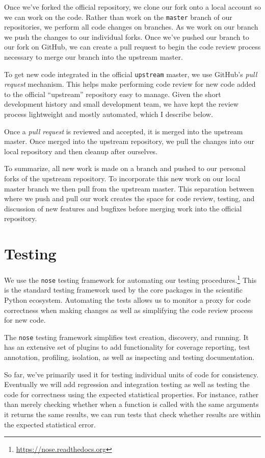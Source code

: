 Once we've forked the official repository, we clone our fork onto a local
account so we can work on the code.  Rather than work on the \texttt{master}
branch of our repositories, we perform all code changes on branches.  As
we work on our branch we push the changes to our individual forks.  Once
we've pushed our branch to our fork on GitHub, we can create a pull request
to begin the code review process necessary to merge our branch into the
upstream master.

To get new code integrated in the official \texttt{upstream} master, we use
GitHub's \emph{pull request} mechanism.  This helps make performing code review
for new code added to the official ``upstream'' repository easy to manage.
Given the short development history and small development team, we have
kept the review process lightweight and mostly automated, which I describe
below.

Once a \emph{pull request} is reviewed and accepted, it is merged into
the upstream master.  Once merged into the upstream repository, we pull
the changes into our local repository and then cleanup after ourselves.

To summarize, all new work is made on a branch and pushed to our
personal forks of the upstream repository. To incorporate this new
work on our local master branch we then pull from the upstream
master.  This separation between where we push and pull our
work creates the space for code review, testing, and discussion of
new features and bugfixes before merging work into the official 
repository.

\section{\label{sec:test}Testing}

We use the \texttt{nose} testing framework for automating our testing
procedures.\footnote{\url{https://nose.readthedocs.org}}  This is the standard
testing framework used by the core packages in the scientific Python ecosystem.
Automating the tests allows us to monitor a proxy for code correctness when
making changes as well as simplifying the code review process for new code. 

The \texttt{nose} testing framework simplifies test creation, discovery,
and running. It has an extensive set of plugins to add functionality
for coverage reporting, test annotation, profiling, isolation, as well
as inspecting and testing documentation.

So far, we've primarily used it for testing individual units of code for
consistency.  Eventually we will add regression and integration testing as well
as testing the code for correctness using the expected statistical properties.
For instance, rather than merely checking whether when a function is called
with the same arguments it returns the same results, we can run tests that
check whether results are within the expected statistical error.

